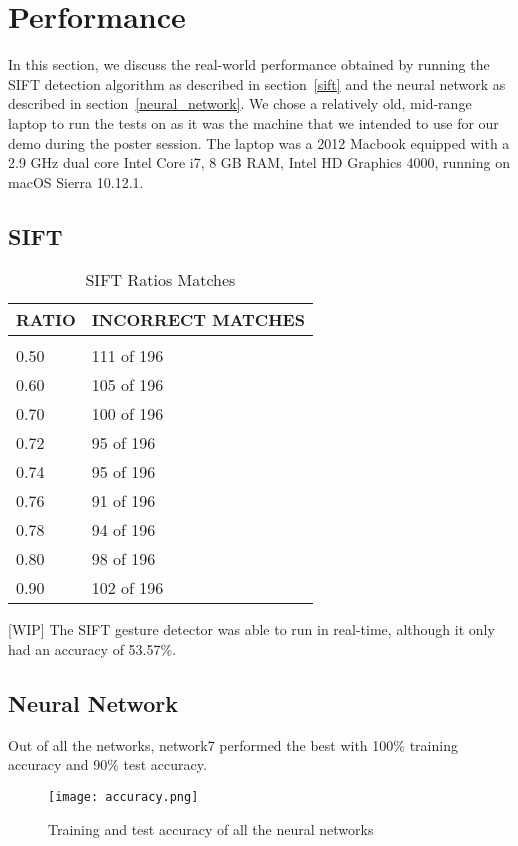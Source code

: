 \section{Performance}
\label{performance}

In this section, we discuss the real-world performance obtained by running the SIFT detection algorithm as described in section~\ref{sift} and the neural network as described in section~\ref{neural_network}. We chose a relatively old, mid-range laptop to run the tests on as it was the machine that we intended to use for our demo during the poster session. The laptop was a 2012 Macbook equipped with a 2.9 GHz dual core Intel Core i7, 8 GB RAM, Intel HD Graphics 4000, running on macOS Sierra 10.12.1.

\subsection{SIFT}

\begin{table}[t]
\caption{SIFT Ratios Matches}
\label{sift_ratios}
\begin{center}
\begin{tabular}{ll}
\multicolumn{1}{c}{\bf RATIO}  &\multicolumn{1}{c}{\bf INCORRECT MATCHES}
\\ \hline \\
0.50             &111 of 196 \\
0.60             &105 of 196 \\
0.70             &100 of 196 \\
0.72             &95 of 196 \\
0.74             &95 of 196 \\
0.76             &91 of 196 \\
0.78             &94 of 196 \\
0.80             &98 of 196 \\
0.90             &102 of 196 \\
\end{tabular}
\end{center}
\end{table}

[WIP] The SIFT gesture detector was able to run in real-time, although it only had an accuracy of 53.57\%.

\subsection{Neural Network}
Out of all the networks, network7 performed the best with 100\% training accuracy and 90\% test accuracy.

\begin{figure}[h]
\texttt{[image: accuracy.png]}
\centering
\caption{Training and test accuracy of all the neural networks}
\end{figure}